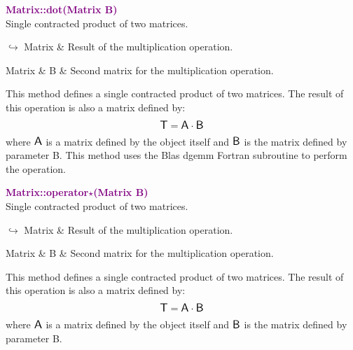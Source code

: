\textcolor{purple}{\textbf{Matrix::dot(Matrix B)}}\label{Matrix::dot(Matrix B)}\\
Single contracted product of two matrices.\vspace*{-0.5em}
\begin{tcolorbox}[grow to left by=-1cm, width=\textwidth-1cm,myArgs,tabularx={l|R}]
$\hookrightarrow$ Matrix & Result of the multiplication operation.
\end{tcolorbox}

\begin{tcolorbox}[width=\textwidth,myArgs,tabularx={ll|R}]
Matrix & B & Second matrix for the multiplication operation.
\end{tcolorbox}

This method defines a single contracted product of two matrices.
The result of this operation is also a matrix defined by:
\begin{equation*}
\mbox{\large\ensuremath{\mathsf{T}}} = \mbox{\large\ensuremath{\mathsf{A}}} \cdot \mbox{\large\ensuremath{\mathsf{B}}}
\end{equation*}
where $\mbox{\large\ensuremath{\mathsf{A}}}$ is a matrix defined by the object itself and $\mbox{\large\ensuremath{\mathsf{B}}}$ is the matrix defined by parameter B.
This method uses the Blas \textsf{dgemm} Fortran subroutine to perform the operation.

\textcolor{purple}{\textbf{Matrix::operator$\star$(Matrix B)}}\label{Matrix::operator*(Matrix B)}\\
Single contracted product of two matrices.\vspace*{-0.5em}
\begin{tcolorbox}[grow to left by=-1cm, width=\textwidth-1cm,myArgs,tabularx={l|R}]
$\hookrightarrow$ Matrix & Result of the multiplication operation.
\end{tcolorbox}

\begin{tcolorbox}[width=\textwidth,myArgs,tabularx={ll|R}]
Matrix & B & Second matrix for the multiplication operation.
\end{tcolorbox}

This method defines a single contracted product of two matrices.
The result of this operation is also a matrix defined by:
\begin{equation*}
\mbox{\large\ensuremath{\mathsf{T}}} = \mbox{\large\ensuremath{\mathsf{A}}} \cdot \mbox{\large\ensuremath{\mathsf{B}}}
\end{equation*}
where $\mbox{\large\ensuremath{\mathsf{A}}}$ is a matrix defined by the object itself and $\mbox{\large\ensuremath{\mathsf{B}}}$ is the matrix defined by parameter B.

